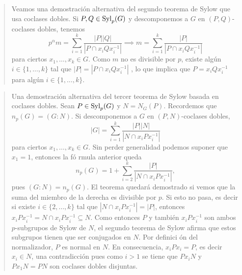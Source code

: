\begin{quote}
Veamos una
demostración alternativa del segundo teorema de Sylow que usa coclases dobles.
Si $P,Q\in\mathrm{Syl}_p(G)$ y
descomponemos a $G$ en $(P,Q)$-coclases dobles, tenemos
\[
p^\alpha m=\sum_{i=1}^k\frac{|P||Q|}{|P\cap x_iQx_i^{-1}|}
\implies
m=\sum_{i=1}^k\frac{|P|}{|P\cap x_iQx_i^{-1}|}
\]
para ciertos $x_1,\dots,x_k\in G$.
Como $m$ no es divisible por $p$, existe algún $i\in\{1,\dots,k\}$ tal que $|P|=|P\cap x_iQx_i^{-1}|$
, lo que
implica que $P=x_iQx_i^{-1}$ para algún $i\in\{1,\dots,k\}$.
\end{quote}

\begin{quote}
Una demostración alternativa del tercer teorema de Sylow basada en coclases dobles.
Sean $P\in\mathrm{Syl}_p(G)$ y $N=N_G(P)$. Recordemos
que $n_p(G)=(G:N)$. Si descomponemos
a $G$ en $(P,N)$-coclases dobles,
\[
|G|=\sum_{i=1}^k\frac{|P||N|}{|N\cap x_iPx_i^{-1}|}
\]
para ciertos $x_1,\dots,x_k\in G$. Sin perder generalidad podemos suponer que $x_1=1$, entonces la fó
rmula anterior queda
\[
n_p(G)=1+\sum_{i=2}^k\frac{|P|}{|N\cap x_iPx_i^{-1}|},
\]
pues $(G:N)=n_p(G)$.
El teorema quedará demostrado si vemos que la suma del miembro de la derecha es divisible por $p$. Si
 esto no pasa,
es decir si existe $i\in\{2,\dots,k\}$ tal que $|N\cap x_iPx_i^{-1}|=|P|$, entonces
$x_iPx_i^{-1}=N\cap x_iPx_i^{-1}\subseteq N$. Como entonces $P$ y también $x_iPx_i^{-1}$ son ambos $p
$-subgrupos de Sylow de $N$,
el segundo teorema de Sylow afirma que estos subgrupos tienen que ser conjugados en $N$. Por definici
ón del normalizador, $P$ es normal en $N$.
En consecuencia, $x_iPx_i=P$, es decir $x_i\in N$, una contradicción pues como $i>1$ se tiene que
$Px_iN$ y $Px_1N=PN$ son coclases dobles disjuntas.
\end{quote}